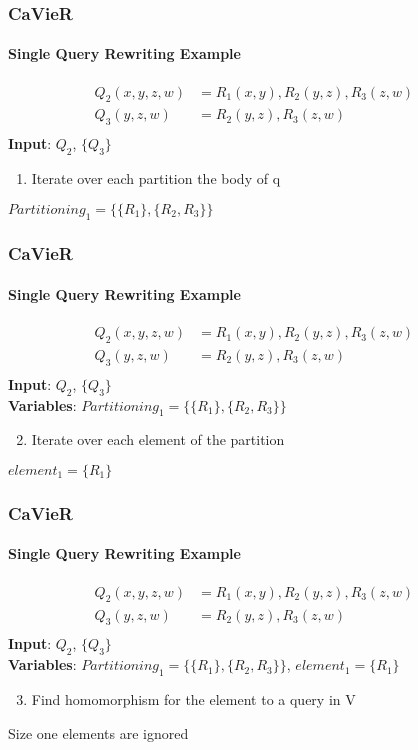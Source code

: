 \documentclass[
	11pt, %
]{beamer}
\begin{document}
\begin{frame}
	\frametitle{CaVieR}
	\framesubtitle{Single Query Rewriting Example}
	\begin{align*}
		Q_2(x,y,z,w) &= R_1(x,y), R_2(y,z), R_3(z,w) &\\
		Q_3(y,z,w) &= R_2(y,z), R_3(z,w)&\\
	\end{align*}
	\textbf{Input}: $Q_2$, $\{Q_3\}$
	\begin{enumerate}
		\item Iterate over each partition the body of q
	\end{enumerate}
	$Partitioning_1 = \{\{R_1\}, \{R_2, R_3\}\}$
	\vspace{3cm}
\end{frame}
\begin{frame}
	\frametitle{CaVieR}
	\framesubtitle{Single Query Rewriting Example}
	\begin{align*}
		Q_2(x,y,z,w) &= R_1(x,y), R_2(y,z), R_3(z,w) &\\
		Q_3(y,z,w) &= R_2(y,z), R_3(z,w)&\\
	\end{align*}
	\textbf{Input}: $Q_2$, $\{Q_3\}$\\
	\textbf{Variables}:
	$Partitioning_1 = \{\{R_1\}, \{R_2, R_3\}\}$
	\begin{enumerate}
		\setcounter{enumi}{1}
		\item Iterate over each element of the partition
	\end{enumerate}
	$element_1 = \{R_1\}$
	\vspace{3cm}
\end{frame}

\begin{frame}
	\frametitle{CaVieR}
	\framesubtitle{Single Query Rewriting Example}
	\begin{align*}
		Q_2(x,y,z,w) &= R_1(x,y), R_2(y,z), R_3(z,w) &\\
		Q_3(y,z,w) &= R_2(y,z), R_3(z,w)&\\
	\end{align*}
	\textbf{Input}: $Q_2$, $\{Q_3\}$\\
	\textbf{Variables}:
	$Partitioning_1 = \{\{R_1\}, \{R_2, R_3\}\}$,
	$element_1 = \{R_1\}$
	\begin{enumerate}
		\setcounter{enumi}{2}
		\item Find homomorphism for the element to a query in V
	\end{enumerate}
	Size one elements are ignored
	\vspace{3cm}
\end{frame}
\end{document}

